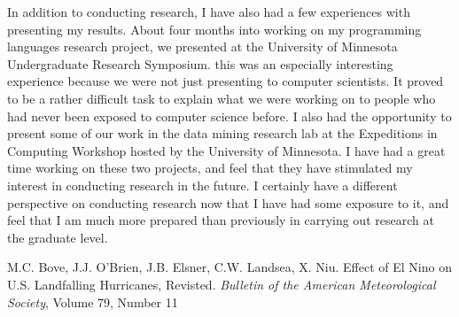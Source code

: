 \documentclass[a4paper,12pt]{article}
\newcommand{\tab}{\hspace*{2em}}
\begin{document}
\tab In addition to conducting research, I have also had a few experiences with presenting my results.  About four months into working on my programming languages research project, we presented at the University of Minnesota Undergraduate Research Symposium.  this was an especially interesting experience because we were not just presenting to computer scientists.  It proved to be a rather difficult task to explain what we were working on to people who had never been exposed to computer science before. I also had the opportunity to present some of our work in the data mining research lab at the Expeditions in Computing Workshop hosted by the University of Minnesota. \newline
\tab I have had a great time working on these two projects, and feel that they have stimulated my interest in conducting research in the future.  I certainly have a different perspective on conducting research now that I have had some exposure to it, and feel that I am much more prepared than previously in carrying out research at the graduate level.  
\begin{thebibliography}{9} \vspace{-1ex}
M.C. Bove, J.J. O'Brien, J.B. Elsner, C.W. Landsea, X. Niu.  Effect of El Nino on U.S. Landfalling Hurricanes, Revisted.  \textit{Bulletin of the American Meteorological Society}, Volume 79, Number 11
\end{thebibliography}
\end{document}
